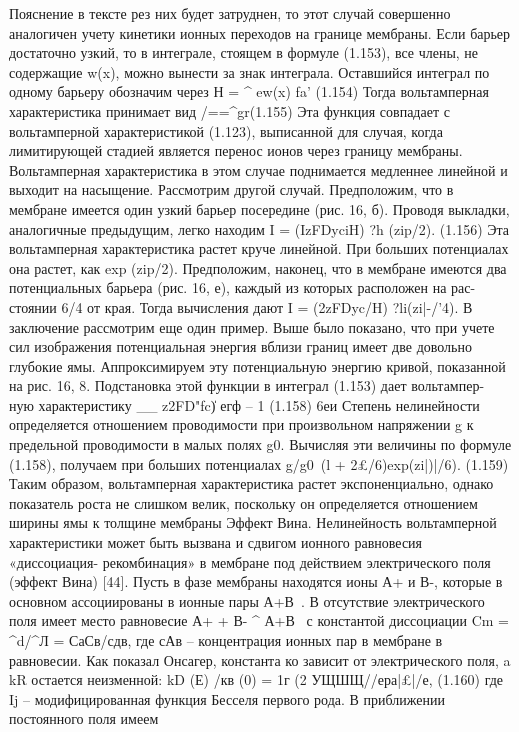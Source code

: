 {Пояснение в тексте
рез них будет затруднен, то этот случай совершенно аналогичен учету кинетики ионных переходов на границе мембраны. Если барьер достаточно узкий, то в интеграле, стоящем в формуле (1.153), все члены, не содержащие w(x), можно вынести за знак интеграла. Оставшийся интеграл по одному барьеру обозначим через
Н = ^ ew(x) fa' (1.154)
Тогда вольтамперная характеристика принимает вид
/==^gr(1.155)
Эта функция совпадает с вольтамперной характеристикой (1.123), выписанной для случая, когда лимитирующей стадией является перенос ионов через границу мембраны. Вольтамперная характеристика в этом случае поднимается медленнее линейной и выходит на насыщение.
Рассмотрим другой случай. Предположим, что в мембране имеется один узкий барьер посередине (рис. 16, б). Проводя выкладки, аналогичные предыдущим, легко находим
I = (IzFDyciH) ?h (zip/2). (1.156)
Эта вольтамперная характеристика растет круче линейной. При больших потенциалах она растет, как exp (zip/2).
Предположим, наконец, что в мембране имеются два потенциальных барьера (рис. 16, е), каждый из которых расположен на рас- 
стоянии 6/4 от края. Тогда вычисления дают I = (2zFDyc/H) ?li(zi|-/'4).
В заключение рассмотрим еще один пример. Выше было показано, что при учете сил изображения потенциальная энергия вблизи границ имеет две довольно глубокие ямы. Аппроксимируем эту потенциальную энергию кривой, показанной на рис. 16, 8. Подстановка этой функции в интеграл (1.153) дает вольтампер- ную характеристику
__ z2FD"fc\|) егф -- 1
(1.158)
6еи
Степень нелинейности определяется отношением проводимости при произвольном напряжении g к предельной проводимости в малых полях g0. Вычисляя эти величины по формуле (1.158), получаем при больших потенциалах
g/g0~(l + 2£/6)exp(zi|)|/6). (1.159)
Таким образом, вольтамперная характеристика растет экспоненциально, однако показатель роста не слишком велик, поскольку он определяется отношением ширины ямы к толщине мембраны %
Эффект Вина. Нелинейность вольтамперной характеристики может быть вызвана и сдвигом ионного равновесия «диссоциация- рекомбинация» в мембране под действием электрического поля (эффект Вина) [44].
Пусть в фазе мембраны находятся ионы А+ и В-, которые в основном ассоциированы в ионные пары А+В~. В отсутствие электрического поля имеет место равновесие
А+ + В- ^ А+В~
с константой диссоциации Cm = ^d/^Л = СаСв/сдв,
где сАв -- концентрация ионных пар в мембране в равновесии. Как показал Онсагер, константа ко зависит от электрического поля, a kR остается неизменной:
kD (Е) /кв (0) = 1г (2 УЩШЩ//ера|£|/е, (1.160)
где Ij -- модифицированная функция Бесселя первого рода. В приближении постоянного поля имеем
}

